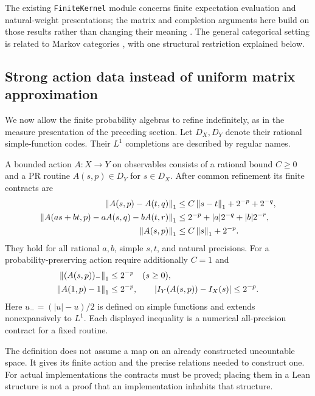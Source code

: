 The existing \texttt{FiniteKernel} module concerns finite expectation
evaluation and natural-weight presentations; the matrix and completion
arguments here build on those results rather than changing their meaning
\cite{repo-finite-kernel,repo-fubini}. The general categorical setting is
related to Markov categories \cite{fritz}, with one structural restriction
explained below.

\subsection{Strong action data instead of uniform matrix approximation}

We now allow the finite probability algebras to refine indefinitely, as in
the measure presentation of the preceding section. Let $D_X,D_Y$ denote
their rational simple-function codes. Their $L^1$ completions are described
by regular names.

\begin{definition}\label{def:action}
A bounded action $A:X\to Y$ on observables consists of a rational bound
$C\ge0$ and a PR routine $A(s,p)\in D_Y$ for $s\in D_X$. After common
refinement its finite contracts are
\begin{align}
 \left\lVert A(s,p)-A(t,q)\right\rVert_1
 &\le C\left\lVert s-t\right\rVert_1+2^{-p}+2^{-q},\label{eq:action-stability}\\
 \left\lVert A(as+bt,p)-aA(s,q)-bA(t,r)\right\rVert_1
 &\le2^{-p}+|a|2^{-q}+|b|2^{-r},\label{eq:action-linearity}\\
 \left\lVert A(s,p)\right\rVert_1&\le C\left\lVert s\right\rVert_1+2^{-p}.\label{eq:action-bound}
\end{align}
They hold for all rational $a,b$, simple $s,t$, and natural precisions.
For a probability-preserving action require additionally $C=1$ and
\begin{align}
 \left\lVert(A(s,p))_-\right\rVert_1&\le2^{-p}\quad(s\ge0),\label{eq:action-positive}\\
 \left\lVert A(1,p)-1\right\rVert_1&\le2^{-p},\qquad
 |I_Y(A(s,p))-I_X(s)|\le2^{-p}.\label{eq:action-preserve}
\end{align}
Here $u_-=(|u|-u)/2$ is defined on simple functions and extends
nonexpansively to $L^1$. Each displayed inequality is a numerical
all-precision contract for a fixed routine.
\end{definition}

The definition does not assume a map on an already constructed uncountable
space. It gives its finite action and the precise relations needed to
construct one. For actual implementations the contracts must be proved;
placing them in a Lean structure is not a proof that an implementation
inhabits that structure.

